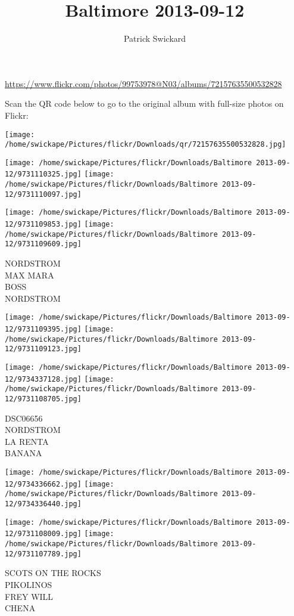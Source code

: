 \documentclass[10pt,letterpaper]{article}
\title{Baltimore 2013-09-12}
\author{Patrick Swickard}
\date{}
\begin{document}
\maketitle

\url{https://www.flickr.com/photos/99753978@N03/albums/72157635500532828}

Scan the QR code below to go to the original album with full-size photos on Flickr:

\texttt{[image: /home/swickape/Pictures/flickr/Downloads/qr/72157635500532828.jpg]}
\pagebreak

\texttt{[image: /home/swickape/Pictures/flickr/Downloads/Baltimore 2013-09-12/9731110325.jpg]}
\texttt{[image: /home/swickape/Pictures/flickr/Downloads/Baltimore 2013-09-12/9731110097.jpg]}

\texttt{[image: /home/swickape/Pictures/flickr/Downloads/Baltimore 2013-09-12/9731109853.jpg]}
\texttt{[image: /home/swickape/Pictures/flickr/Downloads/Baltimore 2013-09-12/9731109609.jpg]}

NORDSTROM\\
MAX MARA\\
BOSS\\
NORDSTROM
\pagebreak

\texttt{[image: /home/swickape/Pictures/flickr/Downloads/Baltimore 2013-09-12/9731109395.jpg]}
\texttt{[image: /home/swickape/Pictures/flickr/Downloads/Baltimore 2013-09-12/9731109123.jpg]}

\texttt{[image: /home/swickape/Pictures/flickr/Downloads/Baltimore 2013-09-12/9734337128.jpg]}
\texttt{[image: /home/swickape/Pictures/flickr/Downloads/Baltimore 2013-09-12/9731108705.jpg]}

DSC06656\\
NORDSTROM\\
LA RENTA\\
BANANA
\pagebreak

\texttt{[image: /home/swickape/Pictures/flickr/Downloads/Baltimore 2013-09-12/9734336662.jpg]}
\texttt{[image: /home/swickape/Pictures/flickr/Downloads/Baltimore 2013-09-12/9734336440.jpg]}

\texttt{[image: /home/swickape/Pictures/flickr/Downloads/Baltimore 2013-09-12/9731108009.jpg]}
\texttt{[image: /home/swickape/Pictures/flickr/Downloads/Baltimore 2013-09-12/9731107789.jpg]}

SCOTS ON THE ROCKS\\
PIKOLINOS\\
FREY WILL\\
CHENA
\pagebreak
\end{document}
